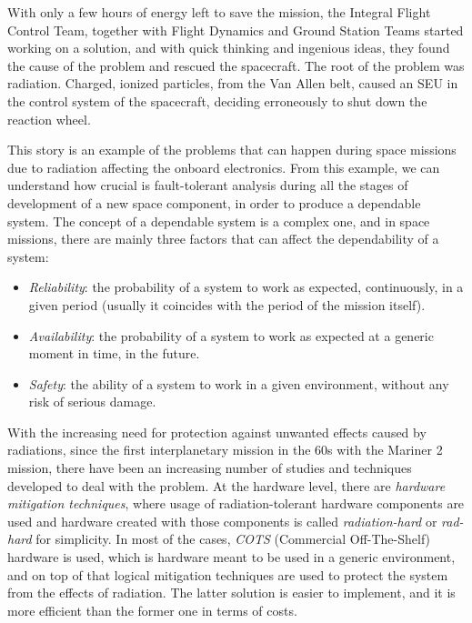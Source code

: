 With only a few hours of energy left to save the mission, the Integral Flight Control Team, together with Flight Dynamics and Ground Station Teams started working on a solution, and with quick thinking and ingenious ideas, they found the cause of the problem and rescued the spacecraft. The root of the problem was radiation. Charged, ionized particles, from the Van Allen belt, caused an SEU in the control system of the spacecraft, deciding erroneously to shut down the reaction wheel. \bigskip

This story is an example of the problems that can happen during space missions due to radiation affecting the onboard electronics. From this example, we can understand how crucial is fault-tolerant analysis during all the stages of development of a new space component, in order to produce a dependable system. The concept of a dependable system is a complex one, and in space missions, there are mainly three factors that can affect the dependability of a system:

\begin{itemize}
    \item \textit{Reliability}: the probability of a system to work as expected, continuously, in a given period (usually it coincides with the period of the mission itself).
    \item \textit{Availability}: the probability of a system to work as expected at a generic moment in time, in the future.
    \item \textit{Safety}: the ability of a system to work in a given environment, without any risk of serious damage.
\end{itemize}

With the increasing need for protection against unwanted effects caused by radiations, since the first interplanetary mission in the 60s with the Mariner 2 mission, there have been an increasing number of studies and techniques developed to deal with the problem. At the hardware level, there are \textit{hardware mitigation techniques}, where usage of radiation-tolerant hardware components are used and hardware created with those components is called \textit{radiation-hard} or \textit{rad-hard} for simplicity. In most of the cases, \textit{COTS} (Commercial Off-The-Shelf) hardware \cite{1589186} is used, which is hardware meant to be used in a generic environment, and on top of that logical mitigation techniques \cite{1546456} are used to protect the system from the effects of radiation. The latter solution is easier to implement, and it is more efficient than the former one in terms of costs. 

